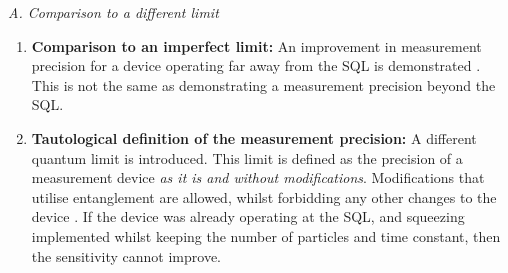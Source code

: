 \documentclass[reqno]{amsart}
\begin{document}
\noindent\textit{A. Comparison to a different limit}
\begin{enumerate}
\item \textbf{Comparison to an imperfect limit:} An improvement in measurement precision for a device operating far away from the SQL is demonstrated \cite{Abadie2011, Aasi2013, Tse2019, Casacio2021}. This is not the same as demonstrating a measurement precision beyond the SQL. %

\item \textbf{Tautological definition of the measurement precision:} A different quantum limit is introduced. This limit is defined as the precision of a measurement device \emph{as it is and without modifications}. Modifications that utilise entanglement are allowed, whilst forbidding any other changes to the device \cite{Wu1986, Xiao1987, Taylor2013}. If the device was already operating at the SQL, and squeezing implemented whilst keeping the number of particles and time constant, then the sensitivity cannot improve.%
\end{enumerate}
\end{document}
